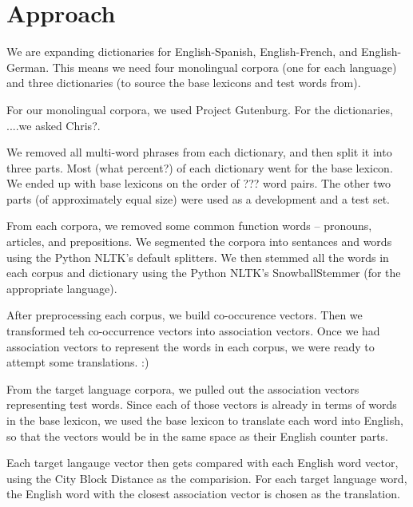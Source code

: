 \documentclass[12pt]{article}
\begin{document}
\section{Approach}

We are expanding dictionaries for English-Spanish, English-French, and English-
German. This means we need four monolingual corpora (one for each language) and
three dictionaries (to source the base lexicons and test words from).

For our monolingual corpora, we used Project Gutenburg. For the dictionaries,
....we asked Chris?.


We removed all multi-word phrases from each dictionary, and then split it into
three parts. Most (what percent?) of each dictionary went for the base lexicon.
We ended up with base lexicons on the order of ??? word pairs. The other two
parts (of approximately equal size) were used as a development and a test set.

From each corpora, we removed some common function words -- pronouns, articles,
and prepositions. We segmented the corpora into sentances and words using the
Python NLTK's default splitters. We then stemmed all the words in each corpus
and dictionary using the Python NLTK's SnowballStemmer (for the appropriate
language).

After preprocessing each corpus, we build co-occurence vectors. Then we
transformed teh co-occurrence vectors into association vectors. Once we had
association vectors to represent the words in each corpus, we were ready to
attempt some translations. :)


From the target language corpora, we pulled out the association vectors
representing test words. Since each of those vectors is already in terms of
words in the base lexicon, we used the base lexicon to translate each word into
English, so that the vectors would be in the same space as their English counter
parts.

Each target langauge vector then gets compared with each English word vector,
using the City Block Distance as the comparision. For each target language word,
the English word with the closest association vector is chosen as the
translation.
\end{document}
